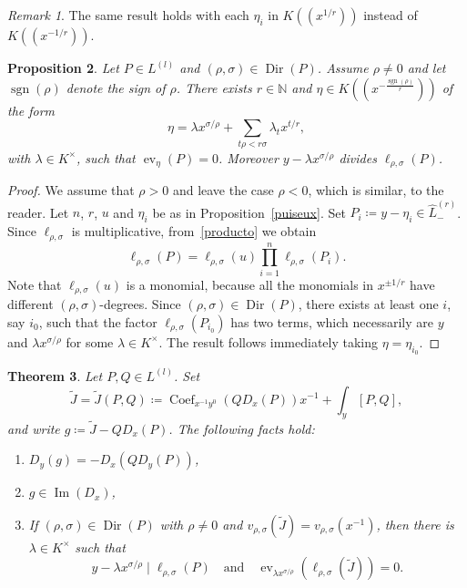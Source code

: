\documentclass[reqno,a4paper]{amsart}
\newtheorem{theorem}{Theorem}[section]
\newtheorem{proposition}[theorem]{Proposition}
\theoremstyle{definition}
\theoremstyle{remark}
\newtheorem{remark}[theorem]{Remark}
\DeclareMathOperator{\sgn}{sgn}
\DeclareMathOperator{\ev}{ev}
\DeclareMathOperator{\Dir}{Dir}
\DeclareMathOperator{\Ima}{Im}
\DeclareMathOperator{\Coef}{Coef}
\begin{document}
\begin{remark} The same result holds with each $\eta_i$ in $K((x^{1/r}))$ instead of $K((x^{-1/r}))$.
\end{remark}

\begin{proposition}\label{Newton Puiseux} Let $P\in L^{(l)}$ and $(\rho,\sigma)\in \Dir(P)$. Assume $\rho\ne 0$ and let $\sgn(\rho)$ denote the
sign of $\rho$. There exists $r\in \mathds{N}$ and $\eta\in K((x^{-\frac{\sgn(\rho)}{r}}))$ of the form
$$
\eta=\lambda x^{\sigma/\rho} + \sum_{t\rho<r\sigma} \lambda_t x^{t/r},
$$
with $\lambda\in K^{\times}$, such that $\ev_{\eta}(P)=0$. Moreover $y-\lambda x^{\sigma/\rho}$ divides $\ell_{\rho,\sigma}(P)$.
\end{proposition}

\begin{proof} We assume that $\rho>0$ and leave the case $\rho<0$, which is similar, to the reader. Let $n$, $r$, $u$ and $\eta_i$ be as in Proposition~\ref{puiseux}. Set $P_i\coloneqq y-\eta_i\in\hat L^{(r)}_-$. Since $\ell_{\rho,\sigma}$ is multiplicative, from~\eqref{producto} we obtain
$$
\ell_{\rho,\sigma}(P)=\ell_{\rho,\sigma}(u) \prod_{i=1}^{n}\ell_{\rho,\sigma}(P_i).
$$
Note that $\ell_{\rho,\sigma}(u)$ is a monomial, because all the monomials in $x^{\pm 1/r}$ have different $(\rho,\sigma)$-degrees. Since $(\rho,\sigma)\in \Dir(P)$, there exists at least one $i$, say $i_0$, such that the factor $\ell_{\rho,\sigma}(P_{i_0})$ has two terms, which necessarily are $y$ and $\lambda x^{\sigma/\rho}$ for some $\lambda\in K^{\times}$.  The result follows immediately taking $\eta=\eta_{i_0}$.
\end{proof}


\begin{theorem}\label{cassier nouges generalizado} Let $P,Q\in L^{(l)}$. Set
$$
\tilde J=\tilde J(P,Q)\coloneqq \Coef_{x^{-1}y^0}(QD_x(P))x^{-1}+\int_y [P,Q],
$$
and write $g\coloneqq \tilde J-Q D_x(P)$. The following facts hold:
\begin{enumerate}

\smallskip

\item $D_y(g)=-D_x(Q D_y(P))$,

\smallskip

\item $g\in \Ima(D_x)$,

\smallskip

\item If $(\rho,\sigma)\in \Dir(P)$ with $\rho\ne 0$ and $v_{\rho,\sigma}(\tilde J)=v_{\rho,\sigma}(x^{-1})$, then there is $\lambda\in K^{\times}$ such that
$$
y-\lambda x^{\sigma/\rho}\mid \ell_{\rho,\sigma}(P)\quad\text{and}\quad \ev_{\lambda x^{\sigma/\rho}}(\ell_{\rho,\sigma}(\tilde J))=0.
$$
\end{enumerate}
\end{theorem}
\end{document}
